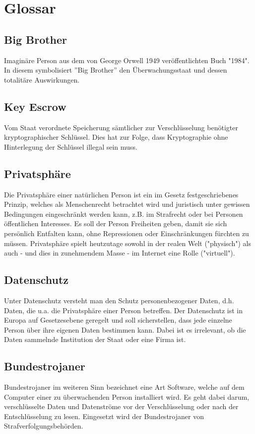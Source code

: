 \section{Glossar}
	
	\subsection{Big Brother}
	  Imaginäre Person aus dem von George Orwell 1949 veröffentlichten 
	  Buch "1984". In diesem symbolisiert ''Big Brother'' den Überwachungsstaat und
	  dessen totalitäre Auswirkungen. 
	
	\subsection{Key Escrow}
	  Vom Staat verordnete Speicherung sämtlicher zur Verschlüsselung 
	  benötigter kryptographischer Schlüssel. Dies hat zur Folge, dass 
	  Kryptographie ohne Hinterlegung der Schlüssel illegal sein muss. 
	
	\subsection{Privatsphäre}
	  Die Privatsphäre einer natürlichen Person ist ein im Gesetz 
	  festgeschriebenes Prinzip, welches als Menschenrecht betrachtet wird und 
	  juristisch unter gewissen Bedingungen eingeschränkt werden kann, z.B. 
	  im Strafrecht oder bei Personen öffentlichen Interesses. Es soll der 
	  Person Freiheiten geben, damit sie sich persönlich Entfalten 
	  kann, ohne Repressionen oder Einschränkungen fürchten zu müssen. 
	  Privatsphäre spielt heutzutage sowohl in der realen Welt ("physisch") 
	  als auch - und dies in zunehmendem Masse - im Internet eine Rolle 
	  ("virtuell"). 
	
	\subsection{Datenschutz}
	  Unter Datenschutz versteht man den Schutz personenbezogener Daten, d.h. 
	  Daten, die u.a. die Privatsphäre einer Person betreffen. Der 
	  Datenschutz ist in Europa auf Gesetzesebene geregelt und soll 
	  sicherstellen, dass jede einzelne Person über ihre eigenen Daten 
	  bestimmen kann. Dabei ist es irrelevant, ob die Daten sammelnde 
	  Institution der Staat oder eine Firma ist. 

	\subsection{Bundestrojaner}
	  Bundestrojaner im weiteren Sinn bezeichnet eine Art Software, welche auf 
	  dem Computer einer zu überwachenden Person installiert wird. Es geht 
	  dabei darum, verschlüsselte Daten und Datenströme vor der 
	  Verschlüsselung oder nach der Entschlüsselung zu lesen. Eingesetzt 
	  wird der Bundestrojaner von Strafverfolgungsbehörden. 
	
